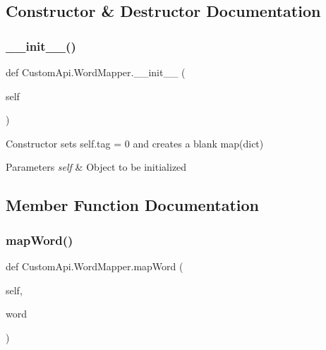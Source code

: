 \subsection{Constructor \& Destructor Documentation}
\mbox{\label{class_custom_api_1_1_word_mapper_a63da7e3e9754aa8b809c7987783e335d}} 
\subsubsection{\texorpdfstring{\+\_\+\+\_\+init\+\_\+\+\_\+()}{\_\_init\_\_()}}
{\footnotesize\ttfamily def Custom\+Api.\+Word\+Mapper.\+\_\+\+\_\+init\+\_\+\+\_\+ (\begin{DoxyParamCaption}\item[{}]{self }\end{DoxyParamCaption})}



Constructor sets self.\+tag = 0 and creates a blank map(dict) 


\begin{DoxyParams}{Parameters}
{\em self} & Object to be initialized \\
\hline
\end{DoxyParams}


\subsection{Member Function Documentation}
\mbox{\label{class_custom_api_1_1_word_mapper_a7fa979bd96ee31d9871fdd31dfd755b6}} 
\subsubsection{\texorpdfstring{map\+Word()}{mapWord()}}
{\footnotesize\ttfamily def Custom\+Api.\+Word\+Mapper.\+map\+Word (\begin{DoxyParamCaption}\item[{}]{self,  }\item[{}]{word }\end{DoxyParamCaption})}



